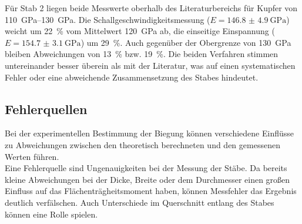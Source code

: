 Für Stab 2 liegen beide Messwerte oberhalb des Literaturbereichs für Kupfer von
\SIrange{110}{130}{\giga\pascal}. Die Schallgeschwindigkeitsmessung
($E = \SI{146.8(49)}{\giga\pascal}$) weicht um \SI{22}{\percent} vom Mittelwert
\SI{120}{\giga\pascal} ab, die einseitige Einspannung
($E = \SI{154.7(31)}{\giga\pascal}$) um \SI{29}{\percent}. Auch gegenüber der
Obergrenze von \SI{130}{\giga\pascal} bleiben Abweichungen von \SI{13}{\percent}
bzw. \SI{19}{\percent}. Die beiden Verfahren stimmen untereinander besser
überein als mit der Literatur, was auf einen systematischen Fehler oder
eine abweichende Zusammensetzung des Stabes hindeutet.

\subsection{Fehlerquellen}
\label{sec:Fehlerquellen}
Bei der experimentellen Bestimmung der Biegung können verschiedene Einflüsse zu Abweichungen zwischen den theoretisch berechneten und den gemessenen Werten führen. \\
Eine Fehlerquelle sind Ungenauigkeiten bei der Messung der Stäbe. Da bereits kleine Abweichungen bei der Dicke, Breite oder dem Durchmesser einen großen Einfluss auf das Flächenträgheitsmoment haben, können Messfehler das Ergebnis deutlich verfälschen. Auch Unterschiede im Querschnitt entlang des Stabes können eine Rolle spielen. \\
